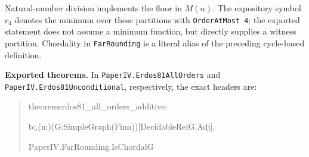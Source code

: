 \documentclass[english,11pt,a4paper]{article}
\newlength{\LeanCharWidth}
\begin{document}
Natural-number division implements the floor in \(M(n)\). The expository
symbol \(c_4\) denotes the minimum over these partitions with
\texttt{OrderAtMost\ 4}; the exported statement does not assume a
minimum function, but directly supplies a witness partition. Chordality
in \nolinkurl{FarRounding} is a literal alias of the preceding cycle-based
definition.

\textbf{Exported theorems.} In \nolinkurl{PaperIV.Erdos81AllOrders} and
\nolinkurl{PaperIV.Erdos81Unconditional}, respectively, the exact headers
are:

\begin{quote}\fontsize{8.5}{10.2}\selectfont\ttfamily\raggedright\setlength{\parskip}{0pt}\settowidth{\LeanCharWidth}{0}
\noindent theorem\hspace*{\dimexpr 1\LeanCharWidth\relax}erdos81\_all\_orders\_additive\hspace*{\dimexpr 1\LeanCharWidth\relax}:\par
\noindent \hspace*{\dimexpr 4\LeanCharWidth\relax}{\LeanSymbols ∃}\hspace*{\dimexpr 1\LeanCharWidth\relax}b\hspace*{\dimexpr 1\LeanCharWidth\relax}:\hspace*{\dimexpr 1\LeanCharWidth\relax}{\LeanSymbols ℕ},\hspace*{\dimexpr 1\LeanCharWidth\relax}{\LeanSymbols ∀}\hspace*{\dimexpr 1\LeanCharWidth\relax}(n\hspace*{\dimexpr 1\LeanCharWidth\relax}:\hspace*{\dimexpr 1\LeanCharWidth\relax}{\LeanSymbols ℕ})\hspace*{\dimexpr 1\LeanCharWidth\relax}(G\hspace*{\dimexpr 1\LeanCharWidth\relax}:\hspace*{\dimexpr 1\LeanCharWidth\relax}SimpleGraph\hspace*{\dimexpr 1\LeanCharWidth\relax}(Fin\hspace*{\dimexpr 1\LeanCharWidth\relax}n))\hspace*{\dimexpr 1\LeanCharWidth\relax}[DecidableRel\hspace*{\dimexpr 1\LeanCharWidth\relax}G.Adj],\par
\noindent \hspace*{\dimexpr 6\LeanCharWidth\relax}PaperIV.FarRounding.IsChordal\hspace*{\dimexpr 1\LeanCharWidth\relax}G\hspace*{\dimexpr 1\LeanCharWidth\relax}{\LeanSymbols →}\par

\end{quote}
\end{document}
